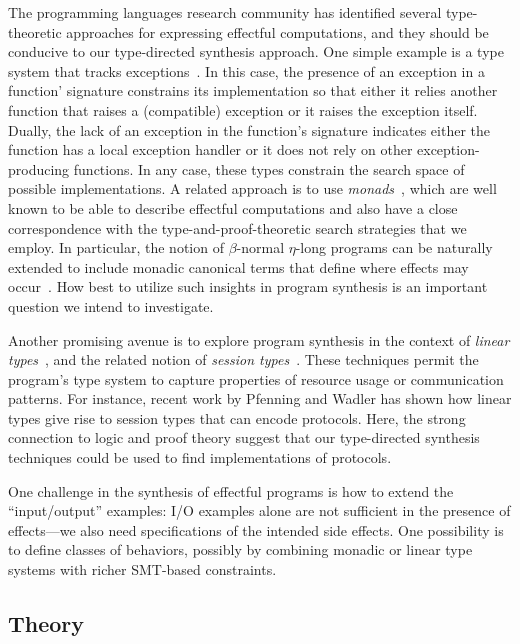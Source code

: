 The programming languages research community has identified several
type-theoretic approaches for expressing effectful computations, and
they should be conducive to our type-directed synthesis approach.  One
simple example is a type system that tracks exceptions~\cite{leroy2000type}.  In this case, the presence of an exception
in a function' signature constrains its implementation so that either
it relies another function that raises a (compatible) exception or it
raises the exception itself.  Dually, the lack of an exception in the
function's signature indicates either the function has a local
exception handler or it does not rely on other exception-producing
functions.  In any case, these types constrain the search space of
possible implementations.  A related approach is to use
\textit{monads}~\cite{moggi1991notions,wadler1998marriage}, which are well known to be able
to describe effectful computations and also have a close correspondence
with the type-and-proof-theoretic search strategies that we employ.
In particular, the notion of $\beta$-normal
$\eta$-long programs can be naturally extended to include monadic
canonical terms that define where effects may occur~\cite{concurrent-logical-framework-propositional,watkins2003concurrent}.  How best to utilize such insights in program synthesis is an important
question we intend to investigate.

Another promising avenue is to explore program synthesis in the
context of \textit{linear types}~\cite{Girard87}, and the related notion
of \textit{session types}~\cite{CairesP10concur,VasconcelosGR06multithreaded,wadler2014propositions}.  These techniques
permit the program's type system to capture properties of resource
usage or communication patterns.  For instance, recent work by
Pfenning and Wadler has shown how linear types give rise to session
types that can encode protocols.  Here, the strong connection to logic
and proof theory suggest that our type-directed synthesis techniques
could be used to find implementations of protocols.

One challenge in the synthesis of effectful programs is how to extend
the ``input/output'' examples: I/O examples alone are not
sufficient in the presence of effects---we also need specifications of
the intended side effects.  One possibility is to define classes of
behaviors, possibly by combining monadic or linear type systems with
richer SMT-based constraints.


\subsection{Theory}

